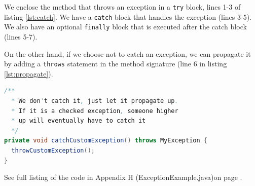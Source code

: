 We enclose the method that throws an exception in a \texttt{try} block, lines 1-3 of listing \ref{lst:catch}. We have a \texttt{catch} block that handles the exception (lines 3-5). We also have an optional \texttt{finally} block that is executed after the catch block (lines 5-7).

On the other hand, if we choose not to catch an exception, we can propagate it by adding a \texttt{throws} statement in the method signature (line 6 in listing \ref{lst:propagate}).

\begin{lstlisting}[language=Java, label=lst:propagate]
/**
  * We don't catch it, just let it propagate up.
  * If it is a checked exception, someone higher
  * up will eventually have to catch it
  */
private void catchCustomException() throws MyException {
  throwCustomException();
}
\end{lstlisting}

See full listing of the code in Appendix H (ExceptionExample.java)on page \pageref{App:AppendixHExample}.
